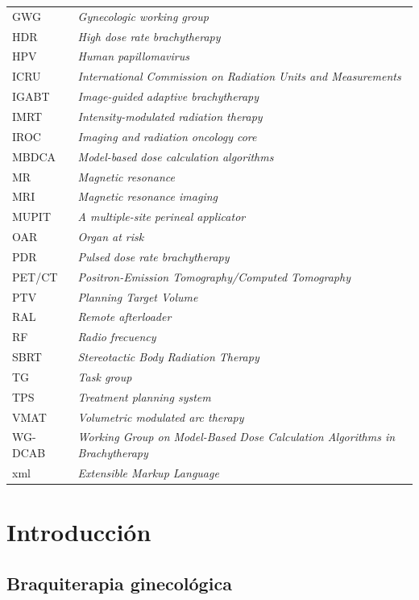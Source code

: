 \documentclass[
  a4paper,
]{scrreprt}
\begin{document}
\begin{longtable}[]{@{}
  >{\raggedright\arraybackslash}p{}
  >{\raggedright\arraybackslash}p{}@{}}
GWG & \emph{Gynecologic working group} \\
HDR & \emph{High dose rate brachytherapy} \\
HPV & \emph{Human papillomavirus} \\
ICRU & \emph{International Commission on Radiation Units and
Measurements} \\
IGABT & \emph{Image-guided adaptive brachytherapy} \\
IMRT & \emph{Intensity-modulated radiation therapy} \\
IROC & \emph{Imaging and radiation oncology core} \\
MBDCA & \emph{Model-based dose calculation algorithms} \\
MR & \emph{Magnetic resonance} \\
MRI & \emph{Magnetic resonance imaging} \\
MUPIT & \emph{A multiple-site perineal applicator} \\
OAR & \emph{Organ at risk} \\
PDR & \emph{Pulsed dose rate brachytherapy} \\
PET/CT & \emph{Positron-Emission Tomography/Computed Tomography} \\
PTV & \emph{Planning Target Volume} \\
RAL & \emph{Remote afterloader} \\
RF & \emph{Radio frecuency} \\
SBRT & \emph{Stereotactic Body Radiation Therapy} \\
TG & \emph{Task group} \\
TPS & \emph{Treatment planning system} \\
VMAT & \emph{Volumetric modulated arc therapy} \\
WG-DCAB & \emph{Working Group on Model-Based Dose Calculation Algorithms
in Brachytherapy} \\
xml & \emph{Extensible Markup Language} \\
\end{longtable}

\newpage{}


\hypertarget{introducciuxf3n}{%
\chapter{Introducción}\label{introducciuxf3n}}

\hypertarget{braquiterapia-ginecoluxf3gica}{%
\section{Braquiterapia
ginecológica}\label{braquiterapia-ginecoluxf3gica}}
\end{document}
